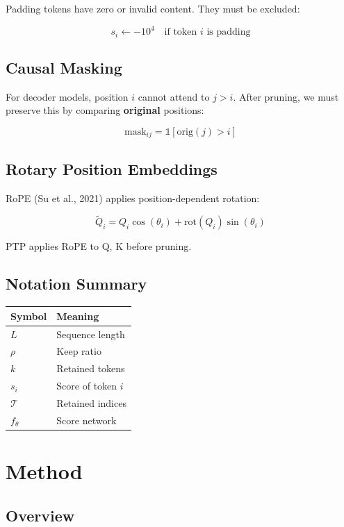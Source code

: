{Padding tokens have zero or invalid content. They must be excluded:

\[
s_i \leftarrow -10^4 \quad \text{if token } i \text{ is padding}
\tag{3.6}
\]

\subsection{Causal Masking}

For decoder models, position $i$ cannot attend to $j > i$. After pruning, 
we must preserve this by comparing \textbf{original} positions:

\[
\text{mask}_{ij} = \mathbb{1}[\text{orig}(j) > i]
\tag{3.7}
\]

\subsection{Rotary Position Embeddings}

RoPE (Su et al., 2021) applies position-dependent rotation:

\[
\tilde{Q}_i = Q_i \cos(\theta_i) + \text{rot}(Q_i) \sin(\theta_i)
\tag{3.8}
\]

PTP applies RoPE to Q, K before pruning.

\subsection{Notation Summary}

\begin{table}[H]
\centering
\small
\begin{tabular}{ll}
\toprule
\textbf{Symbol} & \textbf{Meaning} \\
\midrule
$L$ & Sequence length \\
$\rho$ & Keep ratio \\
$k$ & Retained tokens \\
$s_i$ & Score of token $i$ \\
$\mathcal{T}$ & Retained indices \\
$f_\theta$ & Score network \\
\bottomrule
\end{tabular}
\end{table}




\section{Method}

\subsection{Overview}

}
